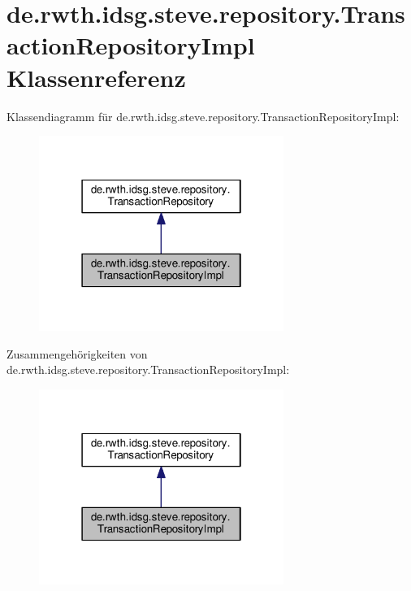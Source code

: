 \hypertarget{classde_1_1rwth_1_1idsg_1_1steve_1_1repository_1_1_transaction_repository_impl}{\section{de.\-rwth.\-idsg.\-steve.\-repository.\-Transaction\-Repository\-Impl Klassenreferenz}
\label{classde_1_1rwth_1_1idsg_1_1steve_1_1repository_1_1_transaction_repository_impl}
}


Klassendiagramm für de.\-rwth.\-idsg.\-steve.\-repository.\-Transaction\-Repository\-Impl\-:
\nopagebreak
\begin{figure}[H]
\begin{center}
\leavevmode
\includegraphics[width=226pt]{classde_1_1rwth_1_1idsg_1_1steve_1_1repository_1_1_transaction_repository_impl__inherit__graph}
\end{center}
\end{figure}


Zusammengehörigkeiten von de.\-rwth.\-idsg.\-steve.\-repository.\-Transaction\-Repository\-Impl\-:
\nopagebreak
\begin{figure}[H]
\begin{center}
\leavevmode
\includegraphics[width=226pt]{classde_1_1rwth_1_1idsg_1_1steve_1_1repository_1_1_transaction_repository_impl__coll__graph}
\end{center}
\end{figure}
